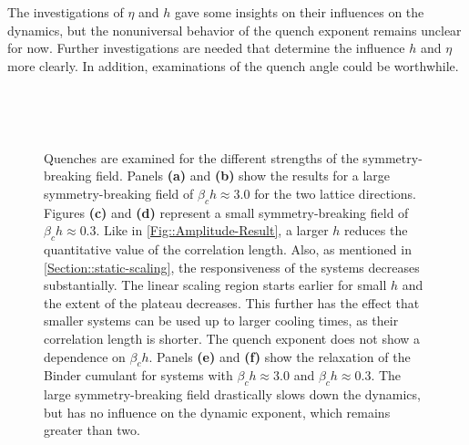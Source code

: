 	The investigations of $\eta$ and $h$ gave some insights on their influences on the dynamics, but the nonuniversal behavior of the quench exponent remains unclear for now. Further investigations are needed that determine the influence $h$ and $\eta$ more clearly. In addition, examinations of the quench angle could be worthwhile.
	\begin{figure}
	\begin{subfigure}{0.475\textwidth}
		\centering		
	\end{subfigure}
	\begin{subfigure}{0.475\textwidth}
		\centering		
	\end{subfigure} \\ \par\bigskip
	\begin{subfigure}{0.475\textwidth}
		\centering
		
	\end{subfigure}
	\begin{subfigure}{0.475\textwidth}
		\centering		
		
	\end{subfigure} \\ \par\bigskip
	\begin{subfigure}{0.475\textwidth}
	\centering		
	
	\end{subfigure}
	\begin{subfigure}{0.475\textwidth}
	\centering
	
	\end{subfigure}
	\caption{Quenches are examined for the different strengths of the symmetry-breaking field. Panels \textbf{(a)} and \textbf{(b)} show the results for a large symmetry-breaking field of $\beta_c h \approx 3.0$ for the two lattice directions. Figures	\textbf{(c)} and \textbf{(d)} represent a small symmetry-breaking field of $\beta_c h \approx 0.3$.  Like in \autoref{Fig::Amplitude-Result}, a larger $h$ reduces the quantitative value of the correlation length. Also, as mentioned in \autoref{Section::static-scaling}, the responsiveness of the systems decreases substantially. The linear scaling region starts earlier for small $h$ and the extent of the plateau decreases. This further has the effect that smaller systems can be used up to larger cooling times, as their correlation length is shorter. The quench exponent does not show a dependence on $\beta_c h$. Panels \textbf{(e)} and \textbf{(f)} show the relaxation of the Binder cumulant for systems with $\beta_c h \approx 3.0$ and $\beta_c h \approx 0.3$. The large symmetry-breaking field drastically slows down the dynamics, but has no influence on the dynamic exponent, which remains greater than two.}
	\label{Fig::Quench-Result-h}
	\end{figure}		
